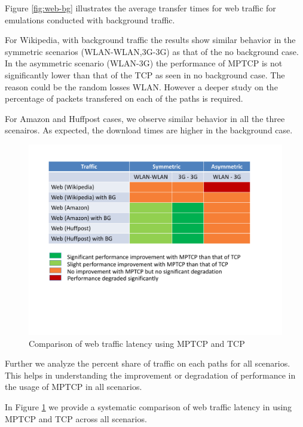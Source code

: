 Figure \ref{fig:web-bg} illustrates the average transfer times for web traffic for emulations conducted with background traffic. 


For Wikipedia, with background traffic the results show similar behavior in the symmetric scenarios (WLAN-WLAN,3G-3G) as that of the 
no background case. In the asymmetric scenario (WLAN-3G) the performance of MPTCP is not significantly lower than that of the TCP as
seen in no background case. The reason could be the random losses WLAN. However a deeper study on the percentage of packets 
transfered on each of the paths is required.

For Amazon and Huffpost cases, we observe similar behavior in all the three scenairos. As expected, the download times are higher in the background case.

\begin{figure}[!th]
\begin{minipage}[t]{0.48\textwidth}
\begin{center}
\includegraphics[width=.98\linewidth]{plots/MPTCP-Web}
\end{center}
\caption{Comparison of web traffic latency using MPTCP and TCP}
  \label{fig:web-summary}
\end{minipage}
\end{figure}

Further we analyze the percent share of traffic on each paths for all scenarios. This helps in understanding the improvement or degradation of performance
in the usage of MPTCP in all scenarios.



In Figure \ref{fig:web-summary} we provide a systematic comparison of web traffic latency in using MPTCP and TCP across all scenarios.
